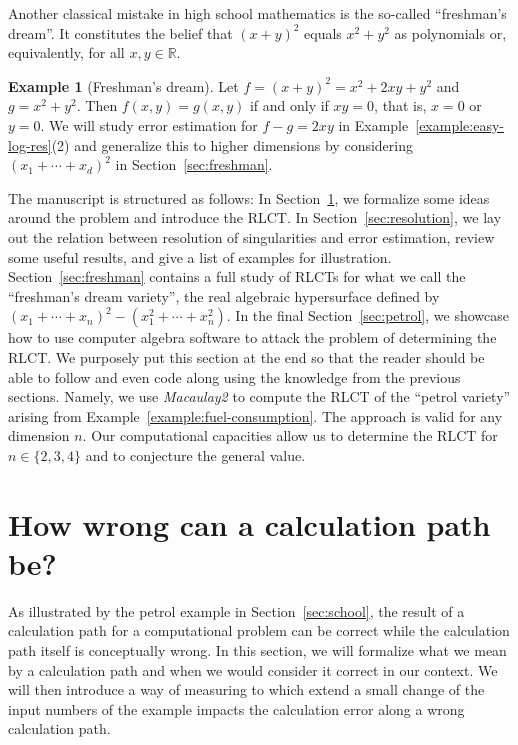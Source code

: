 \documentclass[11pt]{amsart}
\numberwithin{equation}{section}
\theoremstyle{plain}
\theoremstyle{definition}
\newtheorem{example}[theorem]{Example}
\newcommand{\R}{\mathbb{R}}
\begin{document}
Another classical mistake in high school mathematics is the so-called ``freshman's dream''. It constitutes the belief that $(x+y)^2$ equals $x^2 + y^2$ as polynomials or, equivalently, for all $x,y \in \R$.

\begin{example}[Freshman's dream]\label{example:freshman}
    Let $f = (x+y)^2 = x^2 + 2xy + y^2$ and $g = x^2 + y^2$. Then $f(x,y) = g(x,y)$ if and only if $xy = 0$, that is, $x = 0$ or $y = 0$. We will study error estimation for $f-g = 2xy$ in Example~\ref{example:easy-log-res}(2) and generalize this to higher dimensions by considering $(x_1 + \cdots + x_d)^2$ in Section~\ref{sec:freshman}.
\end{example}

The manuscript is structured as follows: In Section~\ref{sec:formalization}, we formalize some ideas around the problem and introduce the RLCT. In Section~\ref{sec:resolution}, we lay out the relation between resolution of singularities and error estimation, review some useful results, and give a list of examples for illustration. Section~\ref{sec:freshman} contains a full study of RLCTs for what we call the ``freshman's dream variety'', the real algebraic hypersurface defined by $(x_1 + \cdots+ x_n)^2 - (x_1^2 + \cdots + x_n^2)$. In the final Section~\ref{sec:petrol}, we showcase how to use computer algebra software to attack the problem of determining the RLCT. We purposely put this section at the end so that the reader should be able to follow and even code along using the knowledge from the previous sections. Namely, we use \emph{Macaulay2} to compute the RLCT of the ``petrol variety'' arising from Example~\ref{example:fuel-consumption}. The approach is valid for any dimension $n$. Our computational capacities allow us to determine the RLCT for $n \in \{2,3,4\}$ and to conjecture the general value.



\section{How wrong can a calculation path be?}\label{sec:formalization}

As illustrated by the petrol example in Section~\ref{sec:school}, the result of a calculation path for a computational problem can be correct while the calculation path itself is conceptually wrong. In this section, we will formalize what we mean by a calculation path and when we would consider it correct in our context. We will then introduce a way of measuring to which extend a small change of the input numbers of the example impacts the calculation error along a wrong calculation path. 
\end{document}
